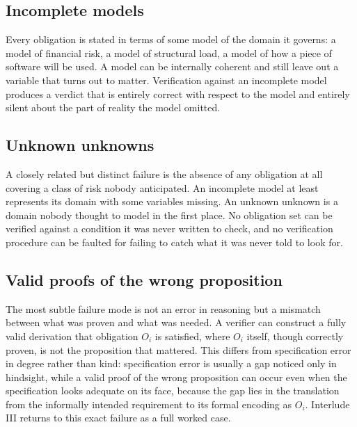 \documentclass[11pt,openany]{book}
\begin{document}
\subsection{Incomplete models}

Every obligation is stated in terms of some model of the domain it governs: a
model of financial risk, a model of structural load, a model of how a piece of
software will be used. A model can be internally coherent and still leave out
a variable that turns out to matter. Verification against an incomplete model
produces a verdict that is entirely correct with respect to the model and
entirely silent about the part of reality the model omitted.

\subsection{Unknown unknowns}

A closely related but distinct failure is the absence of any obligation at
all covering a class of risk nobody anticipated. An incomplete model at least
represents its domain with some variables missing. An unknown unknown is a
domain nobody thought to model in the first place. No obligation set can be
verified against a condition it was never written to check, and no
verification procedure can be faulted for failing to catch what it was never
told to look for.

\subsection{Valid proofs of the wrong proposition}

The most subtle failure mode is not an error in reasoning but a mismatch
between what was proven and what was needed. A verifier can construct a fully
valid derivation that obligation \(O_i\) is satisfied, where \(O_i\) itself,
though correctly proven, is not the proposition that mattered. This differs
from specification error in degree rather than kind: specification error is
usually a gap noticed only in hindsight, while a valid proof of the wrong
proposition can occur even when the specification looks adequate on its face,
because the gap lies in the translation from the informally intended
requirement to its formal encoding as \(O_i\). Interlude III returns to this
exact failure as a full worked case.
\end{document}

